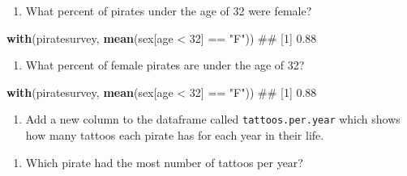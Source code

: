 \documentclass[]{book}
\newenvironment{Shaded}{\begin{snugshade}}{\end{snugshade}}
\newcommand{\KeywordTok}[1]{\textcolor[rgb]{0.13,0.29,0.53}{\textbf{{#1}}}}
\newcommand{\DecValTok}[1]{\textcolor[rgb]{0.00,0.00,0.81}{{#1}}}
\newcommand{\StringTok}[1]{\textcolor[rgb]{0.31,0.60,0.02}{{#1}}}
\newcommand{\NormalTok}[1]{{#1}}
\providecommand{\tightlist}{%
  \setlength{\itemsep}{0pt}\setlength{\parskip}{0pt}}
\theoremstyle{definition}
\theoremstyle{definition}
\theoremstyle{remark}
\begin{document}
\begin{enumerate}
\def\labelenumi{\arabic{enumi}.}
\setcounter{enumi}{4}
\tightlist
\item
  What percent of pirates under the age of 32 were female?
\end{enumerate}

\begin{Shaded}
\begin{Highlighting}[]
\KeywordTok{with}\NormalTok{(piratesurvey, }
     \KeywordTok{mean}\NormalTok{(sex[age <}\StringTok{ }\DecValTok{32}\NormalTok{] ==}\StringTok{ "F"}\NormalTok{))}
\NormalTok{## [1] 0.88}
\end{Highlighting}
\end{Shaded}

\begin{enumerate}
\def\labelenumi{\arabic{enumi}.}
\setcounter{enumi}{5}
\tightlist
\item
  What percent of female pirates are under the age of 32?
\end{enumerate}

\begin{Shaded}
\begin{Highlighting}[]
\KeywordTok{with}\NormalTok{(piratesurvey, }
     \KeywordTok{mean}\NormalTok{(sex[age <}\StringTok{ }\DecValTok{32}\NormalTok{] ==}\StringTok{ "F"}\NormalTok{))}
\NormalTok{## [1] 0.88}
\end{Highlighting}
\end{Shaded}

\begin{enumerate}
\def\labelenumi{\arabic{enumi}.}
\setcounter{enumi}{6}
\tightlist
\item
  Add a new column to the dataframe called \texttt{tattoos.per.year}
  which shows how many tattoos each pirate has for each year in their
  life.
\end{enumerate}

\begin{Shaded}
\end{Shaded}

\begin{enumerate}
\def\labelenumi{\arabic{enumi}.}
\setcounter{enumi}{7}
\tightlist
\item
  Which pirate had the most number of tattoos per year?
\end{enumerate}
\end{document}
